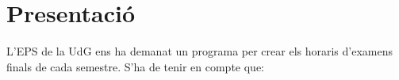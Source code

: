 \documentclass[10pt,a4paper]{../documents/class_material_assignatura_udg}
\begin{document}



\section{Presentació}
\label{sec:presentacio}


L'EPS de la UdG ens ha demanat un programa per crear els horaris d'examens finals de cada semestre. S'ha de tenir en compte que:
\end{document}
